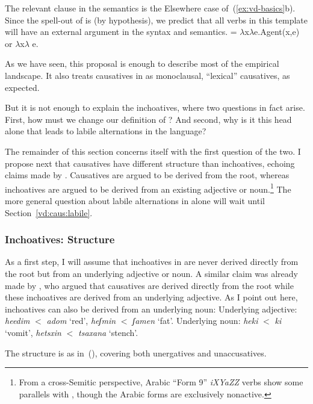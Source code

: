 The relevant clause in the semantics is the Elsewhere case of~(\ref{ex:vd-basics}b). Since the spell-out of {\vd} is {\thif} (by hypothesis), we predict that all verbs in this template will have an external argument in the syntax and semantics.
\ex \denote{\vd} = 	$\lambda$x$\lambda$e.Agent(x,e) or $\lambda$x$\lambda$ e.
\xe

As we have seen, this proposal is enough to describe most of the empirical landscape. It also treats causatives in {\thif} as monoclausal, ``lexical'' causatives, as expected.

But it is not enough to explain the inchoatives, where two questions in fact arise. First, how must we change our definition of {\vd}? And second, why is it this head alone that leads to labile alternations in the language?

The remainder of this section concerns itself with the first question of the two. I propose next that causatives have different structure than inchoatives, echoing claims made by \cite{borer91}. Causatives are argued to be derived from the root, whereas inchoatives are argued to be derived from an existing adjective or noun.\footnote{From a cross-Semitic perspective, Arabic ``Form 9'' \emph{iXYaZZ} verbs show some parallels with {\thif}, though the Arabic forms are exclusively nonactive.} The more general question about labile alternations in {\thif} alone will wait until Section~\ref{vd:caus:labile}.

		\subsubsection{Inchoatives: Structure}
As a first step, I will assume that inchoatives in {\thif} are never derived directly from the root but from an underlying adjective or noun. A similar claim was already made by \cite{borer91}, who argued that causatives are derived directly from the root while these inchoatives are derived from an underlying adjective. As I point out here, inchoatives can also be derived from an underlying noun:
\pex
	\a Underlying adjective: \emph{heedim} $<$ \emph{adom} `red', \emph{heʃmin} $<$ \emph{ʃamen} `fat'.
	\a Underlying noun: \emph{heki} $<$ \emph{ki} `vomit', \emph{he{ts}xin} $<$ \emph{{ts}axana} `stench'.
\xe

The structure is as in~(\nextx), covering both unergatives and unaccusatives.
\ex
\xe

